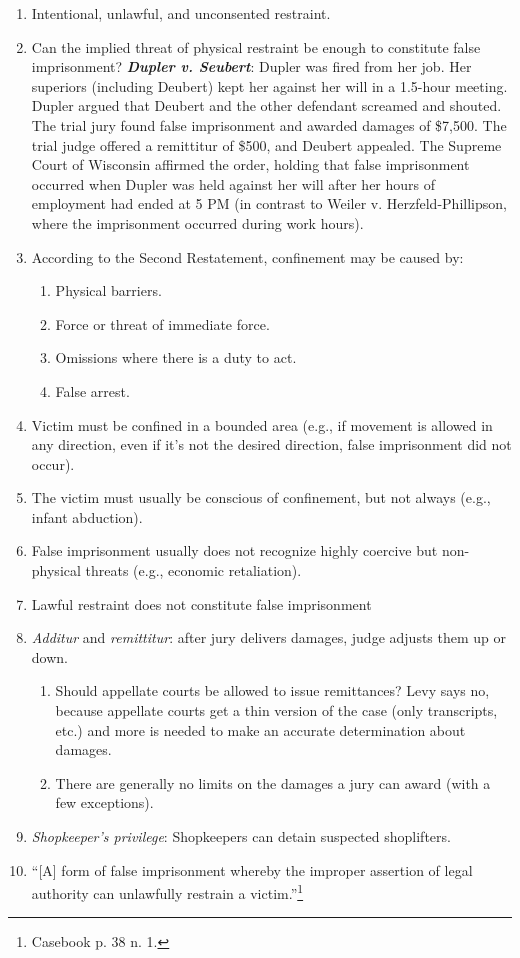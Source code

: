 \begin{enumerate}
    \item Intentional, unlawful, and unconsented restraint.
    \item Can the implied threat of physical restraint be enough to constitute false imprisonment? \textbf{\emph{Dupler v. Seubert}}: Dupler was fired from her job. Her superiors (including Deubert) kept her against her will in a 1.5-hour meeting. Dupler argued that Deubert and the other defendant screamed and shouted. The trial jury found false imprisonment and awarded damages of \$7,500. The trial judge offered a remittitur of \$500, and Deubert appealed. The Supreme Court of Wisconsin affirmed the order, holding that false imprisonment occurred when Dupler was held against her will after her hours of employment had ended at 5 PM (in contrast to Weiler v. Herzfeld-Phillipson, where the imprisonment occurred during work hours).
    \item According to the Second Restatement, confinement may be caused by:
    \begin{enumerate}
        \item Physical barriers.
        \item Force or threat of immediate force.
        \item Omissions where there is a duty to act.
        \item False arrest.
    \end{enumerate}
    \item Victim must be confined in a bounded area (e.g., if movement is allowed in any direction, even if it's not the desired direction, false imprisonment did not occur).
    \item The victim must usually be conscious of confinement, but not always (e.g., infant abduction).
    \item False imprisonment usually does not recognize highly coercive but non-physical threats (e.g., economic retaliation).
    \item Lawful restraint does not constitute false imprisonment
    \item \emph{Additur} and \emph{remittitur}: after jury delivers damages, judge adjusts them up or down.
    \begin{enumerate}
        \item Should appellate courts be allowed to issue remittances? Levy says no, because appellate courts get a thin version of the case (only transcripts, etc.) and more is needed to make an accurate determination about damages.
        \item There are generally no limits on the damages a jury can award (with a few exceptions).
    \end{enumerate}
    \item \emph{Shopkeeper's privilege}: Shopkeepers can detain suspected shoplifters.
    \item ``[A] form of false imprisonment whereby the improper assertion of legal authority can unlawfully restrain a victim.''\footnote{Casebook p. 38 n. 1.}
\end{enumerate}

